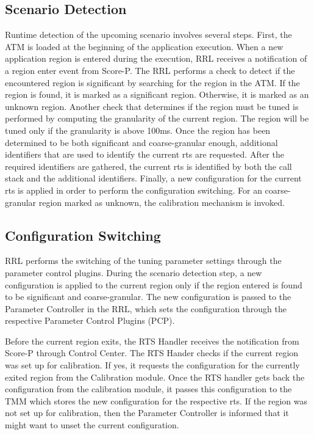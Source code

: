 \subsection{Scenario Detection}\label{scenario-detection}
Runtime detection of the upcoming scenario involves several steps. First, the ATM is loaded at the beginning of the application execution. When a new application region is entered during the execution, RRL receives a notification of a region enter event from Score-P. The RRL performs a check to detect if the encountered region is significant by searching for the region in the ATM. If the region is found, it is marked as a significant region. Otherwise, it is marked as an unknown region. Another check that determines if the region must be tuned is performed by computing the granularity of the current region. The region will be tuned only if the granularity is above 100ms. Once the region has been determined to be both significant and coarse-granular enough, additional identifiers that are used to identify the current rts are requested. After the required identifiers are gathered, the current rts is identified by both the call stack and the additional identifiers. Finally, a new configuration for the current rts is applied in order to perform the configuration switching.
For an coarse-granular region marked as unknown, the calibration mechanism is invoked.

\subsection{Configuration Switching}\label{config-switching}
RRL performs the switching of the tuning parameter settings through the parameter control plugins. During the scenario detection step, a new configuration is applied to the current region only if the region entered is found to be significant and coarse-granular. The new configuration is passed to the Parameter Controller in the RRL, which sets the configuration through the respective Parameter Control Plugins (PCP).

Before the current region exits, the RTS Handler receives the notification  from Score-P through Control Center. The RTS Hander checks if the current region was set up for calibration. If yes, it requests the configuration for the currently exited region from the
Calibration module. Once the RTS handler gets back the configuration from the calibration module, it passes this configuration to the TMM which stores the new configuration for the respective rts. If the region was not set up for calibration, then the Parameter Controller is informed that it might want to unset the current configuration. 

